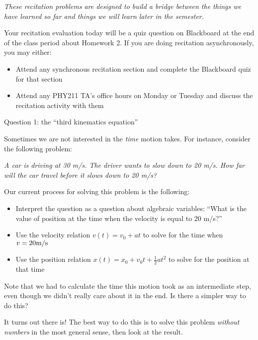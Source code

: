\documentclass[12pt]{article}
\newcommand{\BI}{\begin{itemize}}
\newcommand{\EI}{\end{itemize}}
\begin{document}
\Large
\centerline{}
\normalsize
\centerline{}

\it These recitation problems are designed to build a bridge between the things we have learned so far and things we will learn later in the semester.

\rm


Your recitation evaluation today will be a quiz question on Blackboard at the end of the class period about Homework 2. If you are doing recitation asynchronously, you may either:

\BI
\item Attend any synchronous recitation section and complete the Blackboard quiz for that section
\item Attend any PHY211 TA's office hours on Monday or Tuesday and discuss the recitation activity with them
\EI


\newpage

\rm 

\newpage

\begin{center}
\Large
Question 1: the ``third kinematics equation''
\end{center}

Sometimes we are not interested in the {\it time} motion takes. For instance, consider the following problem:

\begin{center}
	\it A car is driving at 30 m/s. The driver wants to slow down to 20 m/s. How far will the car travel before it slows down to 20 m/s?
\end{center}

Our current process for solving this problem is the following:

\BI
\item Interpret the question as a question about algebraic variables: ``What is the value of position at the time when the velocity is equal to 20 m/s?''
\item Use the velocity relation $v(t) = v_0 + at$ to solve for the time when $v = 20 \rm m/\rm s$
\item Use the position relation $x(t) = x_0 + v_0 t + \frac{1}{2}at^2$ to solve for the position at that time
\EI

Note that we had to calculate the time this motion took as an intermediate step, even though we didn't really care about it in the end. Is there a simpler way to do this?

It turns out there is! The best way to do this is to solve this problem {\it without numbers} in the most general sense, then look at the result.
\end{document}
